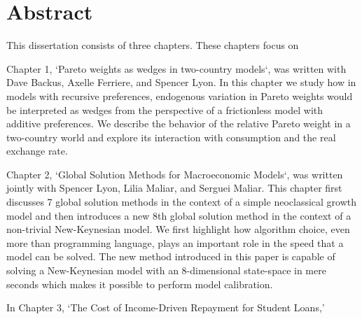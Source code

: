 \documentclass[12pt,letterpaper,oneside,final]{memoir}
\begin{document}
\newpage

\chapter{Abstract}

  \DoubleSpacing

  This dissertation consists of three chapters. These chapters focus on

  Chapter 1, `Pareto weights as wedges in two-country models`, was written with Dave Backus, Axelle
  Ferriere, and Spencer Lyon. In this chapter we study how in models with recursive preferences,
  endogenous variation in Pareto weights would be interpreted as wedges from the perspective of a
  frictionless model with additive preferences. We describe the behavior of the relative Pareto
  weight in a two-country world and explore its interaction with consumption and the real exchange
  rate.

  Chapter 2, `Global Solution Methods for Macroeconomic Models`, was written jointly with Spencer
  Lyon, Lilia Maliar, and Serguei Maliar. This chapter first discusses 7 global solution methods in
  the context of a simple neoclassical growth model and then introduces a new 8th global solution
  method in the context of a non-trivial New-Keynesian model. We first highlight how algorithm
  choice, even more than programming language, plays an important role in the speed that a model can
  be solved. The new method introduced in this paper is capable of solving a New-Keynesian model
  with an 8-dimensional state-space in mere seconds which makes it possible to perform model
  calibration.

  In Chapter 3, `The Cost of Income-Driven Repayment for Student Loans,'

\newpage


  \renewcommand*{\cftappendixname}{Appendix\space}
  \renewcommand*{\contentsname}{Table of Contents}
  \setcounter{tocdepth}{1}%
  \begin{KeepFromToc}
  \tableofcontents*
  \end{KeepFromToc}

\clearpage
\newpage
\clearpage


  \listoffigures
\end{document}
